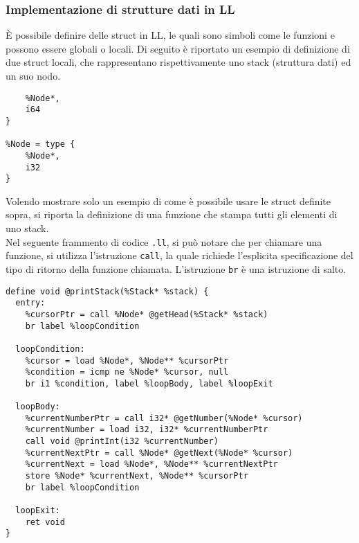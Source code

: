 \subsubsection{Implementazione di strutture dati in LL}
È possibile definire delle struct in LL, le quali sono simboli come le funzioni e possono essere 
globali o locali. Di seguito è riportato un esempio di definizione di due struct locali, che rappresentano 
rispettivamente uno stack (struttura dati) ed un suo nodo. \\

\vspace{0.5cm}
\begin{lstlisting}[frame=single]
%Stack = type { 
    %Node*, 
    i64 
}

%Node = type { 
    %Node*, 
    i32 
}
\end{lstlisting}
\vspace{0.5cm}

Volendo mostrare solo un esempio di come è possibile usare le struct definite sopra,
si riporta la definizione di una funzione che stampa tutti gli elementi di uno stack. \\

Nel seguente frammento di codice \texttt{.ll}, si può notare che per chiamare una funzione, 
si utilizza l'istruzione \texttt{call}, la quale richiede l'esplicita specificazione del tipo
di ritorno della funzione chiamata. L'istruzione \texttt{br} è una istruzione di salto. \\

\vspace{0.5cm}
\begin{lstlisting}[frame=single]
define void @printStack(%Stack* %stack) {
  entry:
    %cursorPtr = call %Node* @getHead(%Stack* %stack)
    br label %loopCondition

  loopCondition:
    %cursor = load %Node*, %Node** %cursorPtr    
    %condition = icmp ne %Node* %cursor, null
    br i1 %condition, label %loopBody, label %loopExit

  loopBody:
    %currentNumberPtr = call i32* @getNumber(%Node* %cursor)
    %currentNumber = load i32, i32* %currentNumberPtr
    call void @printInt(i32 %currentNumber) 
    %currentNextPtr = call %Node* @getNext(%Node* %cursor)
    %currentNext = load %Node*, %Node** %currentNextPtr
    store %Node* %currentNext, %Node** %cursorPtr
    br label %loopCondition

  loopExit:
    ret void
}
\end{lstlisting}
\vspace{0.5cm}